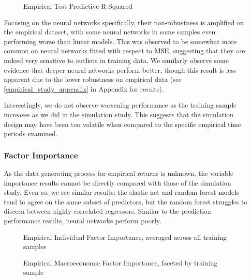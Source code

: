 \documentclass{article}
\begin{document}
\begin{figure}[!htb]
	\centering
	\caption{Empirical Test Predictive R-Squared}
\end{figure}

Focusing on the neural networks specifically, their non-robustness is amplified on the empirical dataset, with some neural networks in some samples even performing worse than linear models. This was observed to be somewhat more common on neural networks fitted with respect to MSE, suggesting that they are indeed very sensitive to outliers in training data. We similarly observe some evidence that deeper neural networks perform better, though this result is less apparent due to the lower robustness on empirical data (see \ref{empirical_study_appendix} in Appendix for results).

Interestingly, we do not observe worsening performance as the training sample increases as we did in the simulation study. This suggests that the simulation design may have been too volatile when compared to the specific empirical time periods examined.


\subsubsection{Factor Importance}

As the data generating process for empirical returns is unknown, the variable importance results cannot be directly compared with those of the simulation study. Even so, we see similar results: the elastic net and random forest models tend to agree on the same subset of predictors, but the random forest struggles to discern between highly correlated regressors. Similar to the prediction performance results, neural networks perform poorly.

\begin{figure}[!htb]
	\centering
	\caption{Empirical Individual Factor Importance, averaged across all training samples}
\end{figure}

\begin{figure}[!htb]
	\label{empirical_macro_facet}
	\centering
	\caption{Empirical Macroeconomic Factor Importance, faceted by training sample}
\end{figure}
\end{document}
